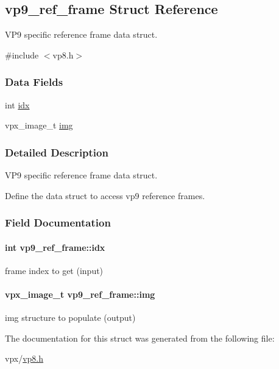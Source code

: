 \hypertarget{structvp9__ref__frame}{\subsection{vp9\-\_\-ref\-\_\-frame \-Struct \-Reference}
\label{structvp9__ref__frame}
}


\-V\-P9 specific reference frame data struct.  




{\ttfamily \#include $<$vp8.\-h$>$}

\subsubsection*{\-Data \-Fields}
\begin{DoxyCompactItemize}
\item 
int \hyperlink{structvp9__ref__frame_a26e0d119a61c29b72c6ccb91748b6b82}{idx}
\item 
vpx\-\_\-image\-\_\-t \hyperlink{structvp9__ref__frame_ab8d92d960007586ea7c8cd9306e98db2}{img}
\end{DoxyCompactItemize}


\subsubsection{\-Detailed \-Description}
\-V\-P9 specific reference frame data struct. 

\-Define the data struct to access vp9 reference frames. 

\subsubsection{\-Field \-Documentation}
\hypertarget{structvp9__ref__frame_a26e0d119a61c29b72c6ccb91748b6b82}{
\paragraph[{idx}]{\setlength{\rightskip}{0pt plus 5cm}int {\bf vp9\-\_\-ref\-\_\-frame\-::idx}}}\label{structvp9__ref__frame_a26e0d119a61c29b72c6ccb91748b6b82}
frame index to get (input) \hypertarget{structvp9__ref__frame_ab8d92d960007586ea7c8cd9306e98db2}{
\paragraph[{img}]{\setlength{\rightskip}{0pt plus 5cm}vpx\-\_\-image\-\_\-t {\bf vp9\-\_\-ref\-\_\-frame\-::img}}}\label{structvp9__ref__frame_ab8d92d960007586ea7c8cd9306e98db2}
img structure to populate (output) 

\-The documentation for this struct was generated from the following file\-:\begin{DoxyCompactItemize}
\item 
vpx/\hyperlink{vp8_8h}{vp8.\-h}\end{DoxyCompactItemize}
